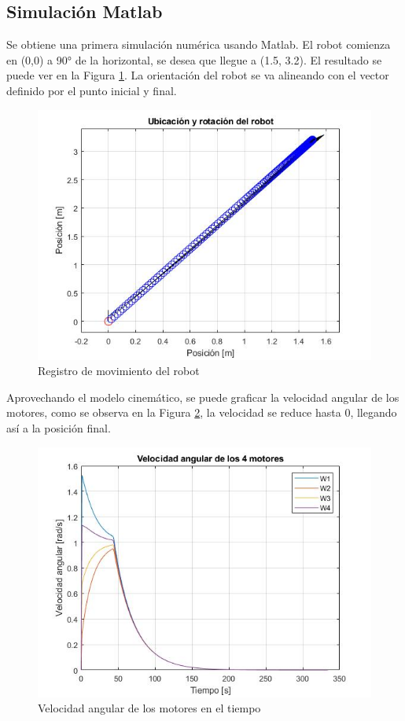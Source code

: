 \documentclass[conference]{IEEEtran}
\begin{document}
\subsection{Simulación Matlab}
Se obtiene una primera simulación numérica usando Matlab.
El robot comienza en (0,0) a 90° de la horizontal, se desea que llegue a (1.5, 3.2).
El resultado se puede ver en la Figura \ref{fig:robotpos}. La orientación del robot
se va alineando con el vector definido por el punto inicial y final.

\begin{figure}
  \includegraphics[width=\linewidth]{figures/matlab_pos_1.jpg}
  \caption{Registro de movimiento del robot}
  \label{fig:robotpos}
\end{figure}


Aprovechando el modelo cinemático, se puede graficar la velocidad angular de
los motores, como se observa en la Figura \ref{fig:motorang}, la velocidad se reduce hasta 0,
llegando así a la posición final.

\begin{figure}
  \includegraphics[width=\linewidth]{figures/matlab_motor_1.jpg}
  \caption{Velocidad angular de los motores en el tiempo}
  \label{fig:motorang}
\end{figure}
\end{document}
